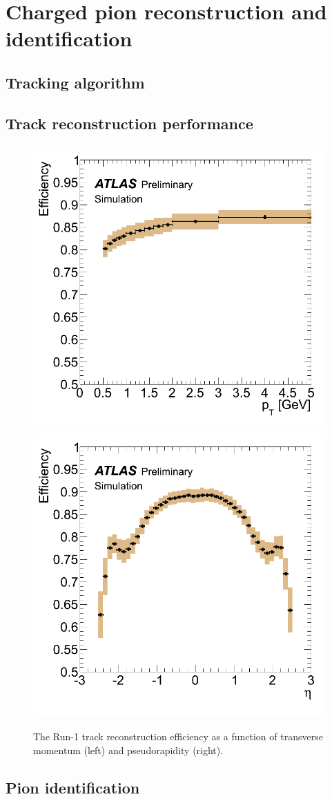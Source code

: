 \chapter{Charged pion reconstruction and identification}
\label{ch:reconstruction}
\graphicspath{{Chapter-Reconstruction/figures/}}


\section{Tracking algorithm}


\cite{Aad:2010bx} %
\cite{Cornelissen:2007vba} %
\cite{Cornelissen:2008zza} %

\section{Track reconstruction performance}

\begin{figure}[t]
  \includegraphics[width=0.49\linewidth]{atl_com_phys_2012_1541_fig_07_eff_pt.png}
  \includegraphics[width=0.49\linewidth]{atl_com_phys_2012_1541_fig_08_eff_eta.png}
  \caption{The Run-1 track reconstruction efficiency as a function of transverse momentum (left) and pseudorapidity (right).}
  \label{fig:trk_eff}
\end{figure}

\section{Pion identification}


